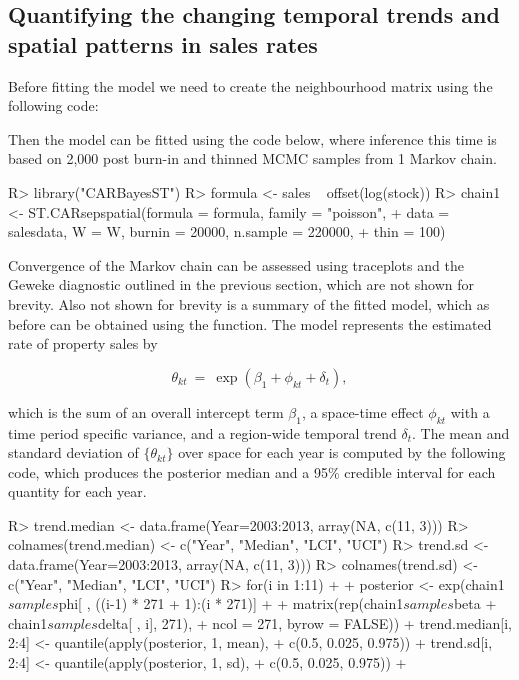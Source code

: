 \documentclass[article, nojss]{jss}
\begin{document}
\subsection{Quantifying the changing temporal trends and spatial patterns in sales rates}
Before fitting the model we need to create the neighbourhood matrix using the following code:


\begin{Schunk}
\end{Schunk}

Then the model can be fitted using the code below, where inference this time is based on 2,000 post burn-in and thinned MCMC samples from 1 Markov chain. 


\begin{CodeInput}
R>  library("CARBayesST")
R>  formula <- sales ~ offset(log(stock))
R>  chain1 <- ST.CARsepspatial(formula = formula, family = "poisson", 
+           data = salesdata, W = W, burnin = 20000, n.sample = 220000, 
+           thin = 100)
\end{CodeInput}

Convergence of the  Markov chain can be assessed using traceplots and the Geweke diagnostic outlined in the previous section, which are not shown for brevity. Also not shown for brevity is a summary of the fitted model, which as before can be obtained using the  function. The model represents the estimated rate of property sales by

$$\theta_{kt}~=~\exp(\beta_1 + \phi_{kt} + \delta_t),$$

which is the sum of an overall intercept term $\beta_1$, a space-time effect $\phi_{kt}$ with a time period specific variance, and a region-wide temporal trend $\delta_t$. The mean and standard deviation of $\{\theta_{kt}\}$ over space for each year is computed by the following code, which produces the posterior median and a 95\% credible interval for each quantity for each year.


\begin{CodeInput}
R>  trend.median <- data.frame(Year=2003:2013, array(NA, c(11, 3)))
R>  colnames(trend.median) <- c("Year", "Median", "LCI", "UCI")
R>  trend.sd <- data.frame(Year=2003:2013, array(NA, c(11, 3)))
R>  colnames(trend.sd) <- c("Year", "Median", "LCI", "UCI")
R>      for(i in 1:11)
+       {
+       posterior <- exp(chain1$samples$phi[ , ((i-1) * 271 + 1):(i * 271)] + 
+                 matrix(rep(chain1$samples$beta + chain1$samples$delta[ , i], 271), 
+                 ncol = 271, byrow = FALSE))
+       trend.median[i, 2:4] <- quantile(apply(posterior, 1, mean), 
+                 c(0.5, 0.025, 0.975))
+       trend.sd[i, 2:4] <- quantile(apply(posterior, 1, sd), 
+                 c(0.5, 0.025, 0.975))
+       }
\end{CodeInput}
\end{document}
